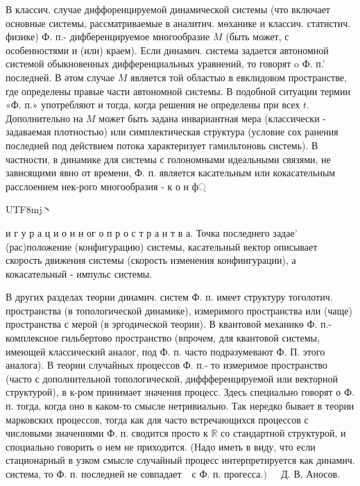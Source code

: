 \documentclass[10pt]{article}
\begin{document}
В классич. случае диффоренцируемой динамической системы (что включает основные системы, рассматриваемые в аналитич. мөханике и классич. статистич. физике) Ф. п.- дифберенцируемое многообразие $M$ (быть может, с особенностями и (или) краем). Если динамич. система задается автономной системой обыкновенных дифференциальных уравнений, то говорят o Ф. п.' последней. В әтом случае $M$ является той областыо в евклидовом пространстве, где определены правые части автономной системы. В подобной ситуации термин «Ф. п.» употребляют и тогда, когда решения не определены при всех $t$. Дополнительно на $M$ может быть задана инвариантная мера (классически - задаваемая плотностью) или симплектическая структура (условие сох ранения последней под действием потока характеризует гамильтоновь системь). В частности, в динамике для системы с голономными идеальными связями, не зависящими явно от времени, Ф. п. является касательным или кокасательным расслоением нек-рого многообразия - к о н ф্\begin{CJK}{UTF8}{mj}丶\end{CJK} и г у р а ц и о н н ог о п р о с т р а н т в а. Точка последнего задае' (рас)положение (конфигурацию) системы, касательный вектор описывает скорость движения системы (скорость изменения конфиигурации), а кокасательный - импульс системы.



В других разделах теории динамич. систем Ф. п. имеет структуру тоголотич. пространства (в топологической динамике), измеримого пространства или (чаще) пространства с мерой (в эргодической теории). В квантовой механикө Ф. п.- комплексное гильбертово пространство (впрочем, для квантовой системы, имеющей классический аналог, под Ф. п. часто подразумевают Ф. П. этого аналога). В теории случайных процессов Ф. п.- то измеримое пространство (часто с дополнительной топологической, диффференцируемой или векторной структурой), в к-ром принимает значения процесс. Здесь специально говорят о Ф. п. тогда, когда оно в каком-то смысле нетривиально. Так нередко бывает в теории марковских процессов, тогда как для часто встречающихся процессов с числовыми значениями Ф. п. сводится просто к $\mathbb{R}$ со стандартной структурой, и споциально говорить о нем не приходится. (Надо иметь в виду, что если стационарный в узком смысле случайный процесс интерпретируется как динамич. система, то Ф. п. последней не совпадает $\begin{array}{ll}\text { с Ф. п. прогесса.) } & \text { Д. В. Аносов. }\end{array}$
\end{document}
